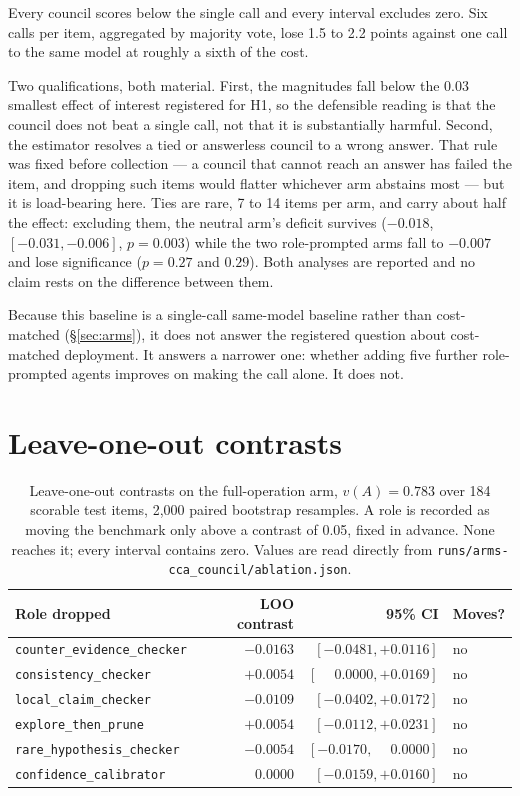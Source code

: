 Every council scores below the single call and every interval excludes zero. Six calls per item,
aggregated by majority vote, lose 1.5 to 2.2 points against one call to the same model at roughly a
sixth of the cost.

Two qualifications, both material. First, the magnitudes fall below the 0.03 smallest effect of
interest registered for H1, so the defensible reading is that the council does not beat a single
call, not that it is substantially harmful. Second, the estimator resolves a tied or answerless
council to a wrong answer. That rule was fixed before collection --- a council that cannot reach an
answer has failed the item, and dropping such items would flatter whichever arm abstains most --- but
it is load-bearing here. Ties are rare, 7 to 14 items per arm, and carry about half the effect:
excluding them, the neutral arm's deficit survives ($-0.018$, $[-0.031, -0.006]$, $p = 0.003$) while
the two role-prompted arms fall to $-0.007$ and lose significance ($p = 0.27$ and $0.29$). Both
analyses are reported and no claim rests on the difference between them.

Because this baseline is a single-call same-model baseline rather than cost-matched
(\S\ref{sec:arms}), it does not answer the registered question about cost-matched deployment. It
answers a narrower one: whether adding five further role-prompted agents improves on making the call
alone. It does not.

\section{Leave-one-out contrasts}
\label{app:loo}

\begin{table}[h]
\centering
\small
\begin{tabular}{lrrl}
\toprule
Role dropped & LOO contrast & 95\% CI & Moves? \\
\midrule
\texttt{counter\_evidence\_checker} & $-0.0163$ & $[-0.0481, +0.0116]$ & no \\
\texttt{consistency\_checker}       & $+0.0054$ & $[\phantom{-}0.0000, +0.0169]$ & no \\
\texttt{local\_claim\_checker}      & $-0.0109$ & $[-0.0402, +0.0172]$ & no \\
\texttt{explore\_then\_prune}       & $+0.0054$ & $[-0.0112, +0.0231]$ & no \\
\texttt{rare\_hypothesis\_checker}  & $-0.0054$ & $[-0.0170, \phantom{+}0.0000]$ & no \\
\texttt{confidence\_calibrator}     & $\phantom{-}0.0000$ & $[-0.0159, +0.0160]$ & no \\
\bottomrule
\end{tabular}
\caption{Leave-one-out contrasts on the full-operation arm, $v(A) = 0.783$ over 184 scorable test
items, 2,000 paired bootstrap resamples. A role is recorded as moving the benchmark only above a
contrast of 0.05, fixed in advance. None reaches it; every interval contains zero. Values are read
directly from \texttt{runs/arms-cca\_council/ablation.json}.}
\label{tab:loo}
\end{table}

